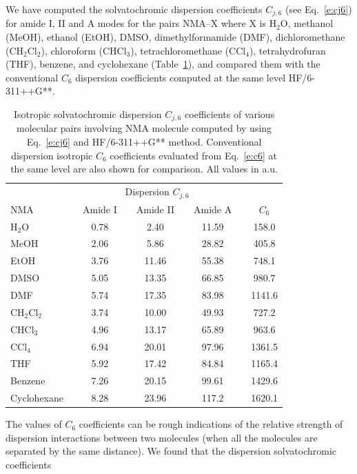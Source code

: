 \documentclass[a4paper,titlepage,twoside,fleqn,12pt]{book}
\begin{document}
\begin{refsection}
We have computed the solvatochromic dispersion coefficients
$C_{j,6}$ (see Eq.~\eqref{e:cj6}) for amide I, II and A modes for the pairs NMA--X
where X is H$_2$O, methanol (MeOH), ethanol (EtOH), DMSO,
dimethylformamide (DMF), dichloromethane (CH$_2$Cl$_2$), chloroform
(CHCl$_3$), tetrachloromethane (CCl$_4$), tetrahydrofuran
(THF), benzene, and cyclohexane (Table~\ref{t:cj6}),
and compared them with the conventional $C_6$ dispersion coefficients
computed at the same level HF/6-311++G**. 
%
\begin{table}[t!]
\caption{
Isotropic solvatochromic dispersion $C_{j,6}$ coefficients of various
molecular pairs involving NMA molecule computed
by using Eq.~\eqref{e:cj6} and HF/6-311++G** method. Conventional dispersion
isotropic $C_6$ coefficients evaluated from Eq.~\eqref{e:c6} at the same level are also
shown for comparison. All values in a.u.
\label{t:cj6}}
\begin{tabular*}{1.0\textwidth}{@{\extracolsep{\fill} } l cccccccc }
\hline\hline
 && \multicolumn{5}{c}{Dispersion $C_{j,6}$} && \\
\cline{3-7}
NMA && Amide I && Amide II && Amide A && $C_6$ \\
\hline
H$_2$O       && 0.78 && 2.40  && 11.59 && 158.0 \\
MeOH         && 2.06 && 5.86  && 28.82 && 405.8 \\
EtOH         && 3.76 && 11.46 && 55.38 && 748.1 \\
DMSO         && 5.05 && 13.35 && 66.85 && 980.7 \\
DMF          && 5.74 && 17.35 && 83.98 && 1141.6 \\
CH$_2$Cl$_2$ && 3.74 && 10.00 && 49.93 && 727.2 \\
CHCl$_3$     && 4.96 && 13.17 && 65.89 && 963.6 \\
CCl$_4$      && 6.94 && 20.01 && 97.96 && 1361.5 \\
THF          && 5.92 && 17.42 && 84.84 && 1165.4 \\
Benzene      && 7.26 && 20.15 && 99.61 && 1429.6 \\
Cyclohexane  && 8.28 && 23.96 && 117.2 && 1620.1 \\
\hline\hline
\end{tabular*}
\end{table}
%
The values of $C_6$ coefficients
can
be rough indications of the relative strength of dispersion interactions
between two molecules (when all the molecules are separated by the same
distance). We found that the dispersion solvatochromic coefficients

\end{refsection}
\end{document}
